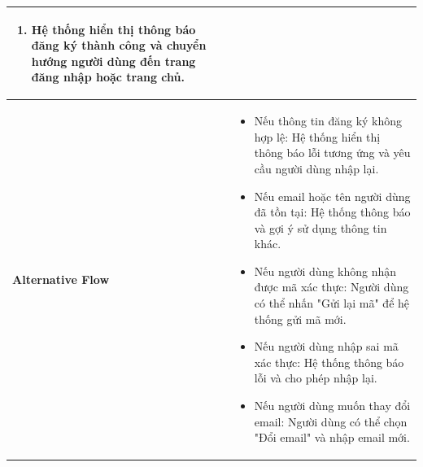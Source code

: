 \begin{longtable}{|>{\bfseries}m{4cm}|m{10cm}|}
\begin{enumerate}
    \item Hệ thống hiển thị thông báo đăng ký thành công và chuyển hướng người dùng đến trang đăng nhập hoặc trang chủ.
\end{enumerate} \\
\hline
Alternative Flow &
\begin{itemize}
    \item Nếu thông tin đăng ký không hợp lệ: Hệ thống hiển thị thông báo lỗi tương ứng và yêu cầu người dùng nhập lại.
    \item Nếu email hoặc tên người dùng đã tồn tại: Hệ thống thông báo và gợi ý sử dụng thông tin khác.
    \item Nếu người dùng không nhận được mã xác thực: Người dùng có thể nhấn "Gửi lại mã" để hệ thống gửi mã mới.
    \item Nếu người dùng nhập sai mã xác thực: Hệ thống thông báo lỗi và cho phép nhập lại.
    \item Nếu người dùng muốn thay đổi email: Người dùng có thể chọn "Đổi email" và nhập email mới.
\end{itemize} \\
\hline
\end{longtable}

